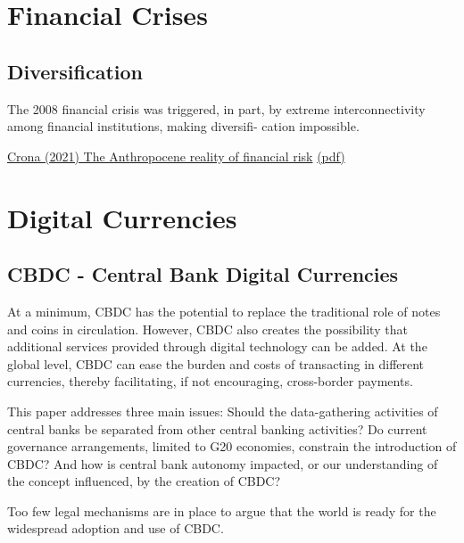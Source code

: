 \documentclass[
]{book}
\begin{document}
\hypertarget{financial-crises}{%
\chapter{Financial Crises}\label{financial-crises}}

\hypertarget{diversification}{%
\section{Diversification}\label{diversification}}

The 2008 financial crisis was triggered, in part, by extreme
interconnectivity among financial institutions, making diversifi-
cation impossible.

\href{https://www.sciencedirect.com/science\%20/article/pii/S2590332221002359\#undfig1}{Crona (2021) The Anthropocene reality of financial risk}
\href{pdf/Crona_2021_Anthropocene_reality_of\%20Financial_Risk.pdf}{(pdf)}

\hypertarget{digital-currencies}{%
\chapter{Digital Currencies}\label{digital-currencies}}

\hypertarget{cbdc---central-bank-digital-currencies}{%
\section{CBDC - Central Bank Digital Currencies}\label{cbdc---central-bank-digital-currencies}}

At a minimum,
CBDC has the potential to replace the traditional
role of notes and coins in circulation. However,
CBDC also creates the possibility that additional
services provided through digital technology
can be added. At the global level, CBDC can ease
the burden and costs of transacting in different
currencies, thereby facilitating, if not encouraging,
cross-border payments.

This paper addresses three main issues: Should
the data-gathering activities of central banks be
separated from other central banking activities?
Do current governance arrangements, limited
to G20 economies, constrain the introduction
of CBDC? And how is central bank autonomy
impacted, or our understanding of the concept
influenced, by the creation of CBDC?

Too few legal mechanisms are in place to argue that
the world is ready for the widespread adoption
and use of CBDC.
\end{document}
